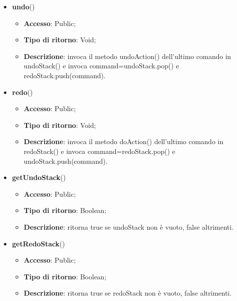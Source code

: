 {{\begin{itemize}
		\item \textbf{undo}()
		\begin{itemize}
			\item \textbf{Accesso}: Public;
			\item \textbf{Tipo di ritorno}: Void;
			\item \textbf{Descrizione}: invoca il metodo undoAction() dell’ultimo comando in undoStack() e invoca command=undoStack.pop() e redoStack.push(command).
		\end{itemize}
		\item \textbf{redo}()
		\begin{itemize}
			\item \textbf{Accesso}: Public;
			\item \textbf{Tipo di ritorno}: Void;
			\item \textbf{Descrizione}: invoca il metodo doAction() dell’ultimo comando in redoStack() e invoca command=redoStack.pop() e undoStack.push(command).
		\end{itemize}
		\item \textbf{getUndoStack}()
		\begin{itemize}
			\item \textbf{Accesso}: Public;
			\item \textbf{Tipo di ritorno}: Boolean;
			\item \textbf{Descrizione}: ritorna true se undoStack non è vuoto, false altrimenti.
		\end{itemize}
		\item \textbf{getRedoStack}()
		\begin{itemize}
			\item \textbf{Accesso}: Public;
			\item \textbf{Tipo di ritorno}: Boolean;
			\item \textbf{Descrizione}: ritorna true se redoStack non è vuoto, false altrimenti.
		\end{itemize}
	\end{itemize}
	
}}
